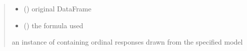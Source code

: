 \documentclass[letterpaper,10pt,english]{sphinxmanual}
\begin{document}
\begin{fulllineitems}
\begin{quote}
\begin{description}
\begin{itemize}
\item {} 
\sphinxAtStartPar
{} () \textendash{} original DataFrame

\item {} 
\sphinxAtStartPar
{} () \textendash{} the formula used

\end{itemize}

\sphinxAtStartPar
an instance of  containing ordinal responses drawn from the specified model

\end{description}\end{quote}

\end{fulllineitems}

\end{document}
